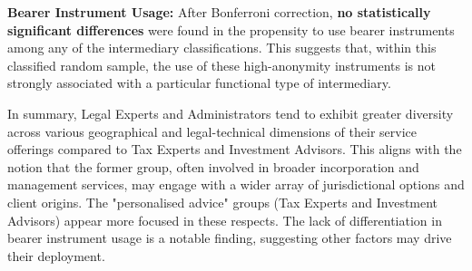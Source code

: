 \textbf{Bearer Instrument Usage:}
After Bonferroni correction, \textbf{no statistically significant differences} were found in the propensity to use bearer instruments among any of the intermediary classifications. This suggests that, within this classified random sample, the use of these high-anonymity instruments is not strongly associated with a particular functional type of intermediary.

In summary, Legal Experts and Administrators tend to exhibit greater diversity across various geographical and legal-technical dimensions of their service offerings compared to Tax Experts and Investment Advisors. This aligns with the notion that the former group, often involved in broader incorporation and management services, may engage with a wider array of jurisdictional options and client origins. The "personalised advice" groups (Tax Experts and Investment Advisors) appear more focused in these respects. The lack of differentiation in bearer instrument usage is a notable finding, suggesting other factors may drive their deployment.

